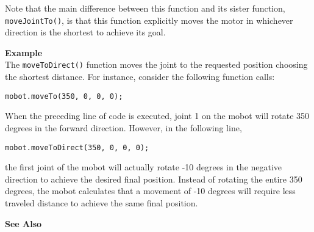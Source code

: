 Note that the main difference between this function and its sister function,
\texttt{moveJointTo()}, is that this function explicitly moves the motor in
whichever direction is the shortest to achieve its goal.

\noindent
{\bf Example}\\
The \texttt{moveToDirect()} function moves the joint to the requested position choosing
the shortest distance. For instance, consider the following function calls:
\begin{verbatim}
mobot.moveTo(350, 0, 0, 0);
\end{verbatim}
When the preceding line of code is executed, joint 1 on the mobot will rotate 350
degrees in the forward direction. However, in the following line,
\begin{verbatim}
mobot.moveToDirect(350, 0, 0, 0);
\end{verbatim}
the first joint of the mobot will actually rotate -10 degrees in the negative direction to achieve the
desired final position. Instead of rotating the entire 350 degrees, the mobot calculates
that a movement of -10 degrees will require less traveled distance to achieve the same final
position.\\
\noindent

\noindent
{\bf See Also}\\

